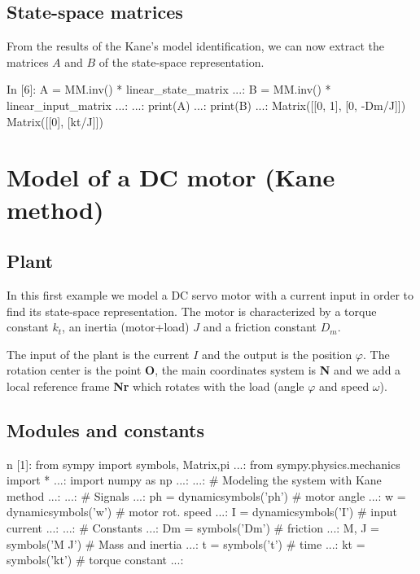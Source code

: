 \subsection{State-space matrices}
From the results of the Kane's model identification, we can now extract the 
matrices $A$ and $B$ of the state-space representation.

\begin{code}
In [6]: A = MM.inv() * linear_state_matrix
   ...: B = MM.inv() * linear_input_matrix
   ...: 
   ...: print(A)
   ...: print(B)
   ...: 
Matrix([[0, 1], [0, -Dm/J]])
Matrix([[0], [kt/J]])
\end{code}

\section{Model of a DC motor (Kane method)} 
\subsection{Plant}
In this first example we model a DC servo motor with a current input in order 
to find its state-space representation. The motor is characterized by a torque 
constant $k_t$, an inertia (motor+load) $J$ and a friction constant $D_m$.

The input of the plant is the current $I$ and the output is the position 
$\varphi$. The rotation center is the point \textbf{O}, the main coordinates 
system is \textbf{N} and we add a local reference frame \textbf{Nr} which 
rotates with the load (angle $\varphi$ and speed $\omega$).

\subsection{Modules and constants}
\begin{code}
n [1]: from sympy import symbols, Matrix,pi
   ...: from sympy.physics.mechanics import *
   ...: import numpy as np
   ...: 
   ...: # Modeling the system with Kane method
   ...: 
   ...: # Signals
   ...: ph = dynamicsymbols('ph')    # motor angle
   ...: w  = dynamicsymbols('w')     # motor rot. speed
   ...: I  = dynamicsymbols('I')     # input current
   ...: 
   ...: # Constants
   ...: Dm = symbols('Dm')           # friction
   ...: M, J = symbols('M J')        # Mass and inertia
   ...: t = symbols('t')             # time
   ...: kt  = symbols('kt')          # torque constant
   ...: 
\end{code}

